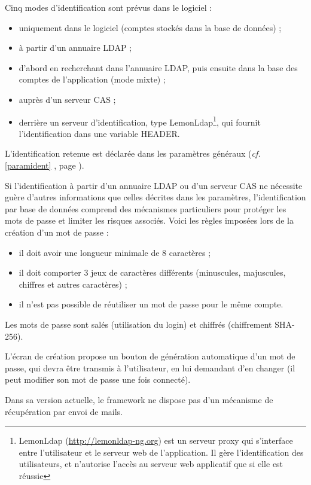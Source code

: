 Cinq modes d'identification sont prévus dans le logiciel :
\begin{itemize}
\item uniquement dans le logiciel (comptes stockés dans la base de données) ;
\item à partir d'un annuaire LDAP ;
\item d'abord en recherchant dans l'annuaire LDAP, puis ensuite dans la base des comptes de l'application (mode mixte) ;
\item auprès d'un serveur CAS ;
\item derrière un serveur d'identification, type LemonLdap\footnote{LemonLdap (\url{http://lemonldap-ng.org}) est un serveur proxy qui s'interface entre l'utilisateur et le serveur web de l'application. Il gère l'identification des utilisateurs, et n'autorise l'accès au serveur web applicatif que si elle est réussie}, qui fournit l'identification dans une variable HEADER.
\end{itemize}

L'identification retenue est déclarée dans les paramètres généraux (\textit{cf.} \ref{paramident} \textit{}, page \pageref{paramident}).

Si l'identification à partir d'un annuaire LDAP ou d'un serveur CAS ne nécessite guère d'autres informations que celles décrites dans les paramètres, l'identification par base de données comprend des mécanismes particuliers pour protéger les mots de passe et limiter les risques associés. Voici les règles imposées lors de la création d'un mot de passe : 
\begin{itemize}
\item il doit avoir une longueur minimale de 8 caractères ;
\item il doit comporter 3 jeux de caractères différents (minuscules, majuscules, chiffres et autres caractères) ;
\item il n'est pas possible de réutiliser un mot de passe pour le même compte.
\end{itemize}

Les mots de passe sont salés (utilisation du login) et chiffrés (chiffrement SHA-256).

L'écran de création propose un bouton de génération automatique d'un mot de passe, qui devra être transmis à l'utilisateur, en lui demandant d'en changer (il peut modifier son mot de passe une fois connecté).

Dans sa version actuelle, le framework ne dispose pas d'un mécanisme de récupération par envoi de mails.

